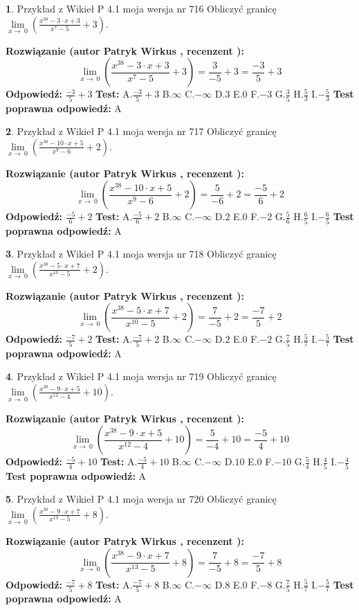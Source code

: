 \documentclass[12pt, a4paper]{article}
\theoremstyle{definition} %
\newtheorem{zad}{}
\newcommand{\zadStart}[1]{\begin{zad}#1\newline}
\newcommand{\zadStop}{\end{zad}}
\newcommand{\rozwStart}[2]{\noindent \textbf{Rozwiązanie (autor #1 , recenzent #2): }\newline}
\newcommand{\rozwStop}{\newline}
\newcommand{\odpStart}{\noindent \textbf{Odpowiedź:}\newline}
\newcommand{\odpStop}{\newline}
\newcommand{\testStart}{\noindent \textbf{Test:}\newline}
\newcommand{\testStop}{\newline}
\newcommand{\kluczStart}{\noindent \textbf{Test poprawna odpowiedź:}\newline}
\newcommand{\kluczStop}{\newline}
\begin{document}
\zadStart{Przykład z Wikieł P 4.1 moja wersja nr 716}
Obliczyć granicę $\lim\limits_{x\to\ 0}(\frac{x^{38}-3 \cdot x +3}{x^{7}-5}+3)$.
\zadStop
\rozwStart{Patryk Wirkus}{}
$$\lim\limits_{x\to\ 0}(\frac{x^{38}-3 \cdot x +3}{x^{7}-5}+3)=\frac{3}{-5}+3=\frac{-3}{5}+3$$
\rozwStop
\odpStart
$\frac{-3}{5}+3$
\odpStop
\testStart
A.$\frac{-3}{5}+3$
B.$\infty$
C.$-\infty$
D.$3$
E.$0$
F.$-3$
G.$\frac{3}{5}$
H.$\frac{5}{3}$
I.$-\frac{5}{3}$
\testStop
\kluczStart
A
\kluczStop



\zadStart{Przykład z Wikieł P 4.1 moja wersja nr 717}
Obliczyć granicę $\lim\limits_{x\to\ 0}(\frac{x^{38}-10 \cdot x +5}{x^{9}-6}+2)$.
\zadStop
\rozwStart{Patryk Wirkus}{}
$$\lim\limits_{x\to\ 0}(\frac{x^{38}-10 \cdot x +5}{x^{9}-6}+2)=\frac{5}{-6}+2=\frac{-5}{6}+2$$
\rozwStop
\odpStart
$\frac{-5}{6}+2$
\odpStop
\testStart
A.$\frac{-5}{6}+2$
B.$\infty$
C.$-\infty$
D.$2$
E.$0$
F.$-2$
G.$\frac{5}{6}$
H.$\frac{6}{5}$
I.$-\frac{6}{5}$
\testStop
\kluczStart
A
\kluczStop



\zadStart{Przykład z Wikieł P 4.1 moja wersja nr 718}
Obliczyć granicę $\lim\limits_{x\to\ 0}(\frac{x^{38}-5 \cdot x +7}{x^{10}-5}+2)$.
\zadStop
\rozwStart{Patryk Wirkus}{}
$$\lim\limits_{x\to\ 0}(\frac{x^{38}-5 \cdot x +7}{x^{10}-5}+2)=\frac{7}{-5}+2=\frac{-7}{5}+2$$
\rozwStop
\odpStart
$\frac{-7}{5}+2$
\odpStop
\testStart
A.$\frac{-7}{5}+2$
B.$\infty$
C.$-\infty$
D.$2$
E.$0$
F.$-2$
G.$\frac{7}{5}$
H.$\frac{5}{7}$
I.$-\frac{5}{7}$
\testStop
\kluczStart
A
\kluczStop



\zadStart{Przykład z Wikieł P 4.1 moja wersja nr 719}
Obliczyć granicę $\lim\limits_{x\to\ 0}(\frac{x^{38}-9 \cdot x +5}{x^{12}-4}+10)$.
\zadStop
\rozwStart{Patryk Wirkus}{}
$$\lim\limits_{x\to\ 0}(\frac{x^{38}-9 \cdot x +5}{x^{12}-4}+10)=\frac{5}{-4}+10=\frac{-5}{4}+10$$
\rozwStop
\odpStart
$\frac{-5}{4}+10$
\odpStop
\testStart
A.$\frac{-5}{4}+10$
B.$\infty$
C.$-\infty$
D.$10$
E.$0$
F.$-10$
G.$\frac{5}{4}$
H.$\frac{4}{5}$
I.$-\frac{4}{5}$
\testStop
\kluczStart
A
\kluczStop



\zadStart{Przykład z Wikieł P 4.1 moja wersja nr 720}
Obliczyć granicę $\lim\limits_{x\to\ 0}(\frac{x^{38}-9 \cdot x +7}{x^{13}-5}+8)$.
\zadStop
\rozwStart{Patryk Wirkus}{}
$$\lim\limits_{x\to\ 0}(\frac{x^{38}-9 \cdot x +7}{x^{13}-5}+8)=\frac{7}{-5}+8=\frac{-7}{5}+8$$
\rozwStop
\odpStart
$\frac{-7}{5}+8$
\odpStop
\testStart
A.$\frac{-7}{5}+8$
B.$\infty$
C.$-\infty$
D.$8$
E.$0$
F.$-8$
G.$\frac{7}{5}$
H.$\frac{5}{7}$
I.$-\frac{5}{7}$
\testStop
\kluczStart
A
\kluczStop
\end{document}
